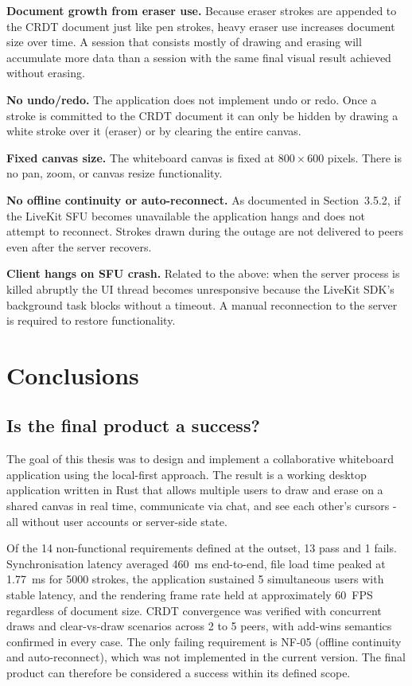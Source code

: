 \documentclass[a4paper,11pt,twoside]{report}
\theoremstyle{definition}
\begin{document}
\textbf{Document growth from eraser use.} Because eraser strokes are appended to the
CRDT document just like pen strokes, heavy eraser use increases document size over time.
A session that consists mostly of drawing and erasing will accumulate more data than a
session with the same final visual result achieved without erasing.

\textbf{No undo/redo.} The application does not implement undo or redo. Once a stroke
is committed to the CRDT document it can only be hidden by drawing a white stroke over
it (eraser) or by clearing the entire canvas.

\textbf{Fixed canvas size.} The whiteboard canvas is fixed at $800 \times 600$ pixels.
There is no pan, zoom, or canvas resize functionality.

\textbf{No offline continuity or auto-reconnect.} As documented in Section~3.5.2, if
the LiveKit SFU becomes unavailable the application hangs and does not attempt to
reconnect. Strokes drawn during the outage are not delivered to peers even after the
server recovers.

\textbf{Client hangs on SFU crash.} Related to the above: when the server process is
killed abruptly the UI thread becomes unresponsive because the LiveKit SDK's background
task blocks without a timeout. A manual reconnection to the server is required to restore functionality.



\chapter{Conclusions}

\section{Is the final product a success?}

The goal of this thesis was to design and implement a collaborative whiteboard application
using the local-first approach. The result is a working desktop application written in Rust
that allows multiple users to draw and erase on a shared canvas in real time, communicate
via chat, and see each other's cursors - all without user accounts or server-side state.

Of the 14 non-functional requirements defined at the outset, 13 pass and 1 fails.
Synchronisation latency averaged 460~ms end-to-end, file load time peaked at 1.77~ms for
5000 strokes, the application sustained 5 simultaneous users with stable latency, and the
rendering frame rate held at approximately 60~FPS regardless of document size. CRDT
convergence was verified with concurrent draws and clear-vs-draw scenarios across 2 to 5
peers, with add-wins semantics confirmed in every case. The only failing requirement is
NF-05 (offline continuity and auto-reconnect), which was not implemented in the current
version. The final product can therefore be considered a success within its defined scope.
\end{document}
